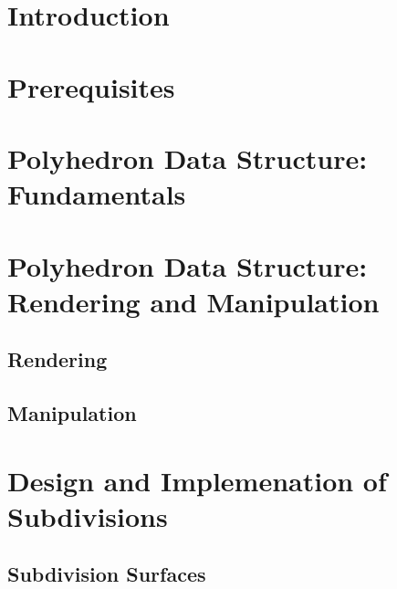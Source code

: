 \documentclass[letter,twoside,10pt]{article}
\begin{document}
\section{Introduction}
%

\section{Prerequisites}
% 

\section{Polyhedron Data Structure: Fundamentals}
 

\section{Polyhedron Data Structure: Rendering and Manipulation}

\subsection{Rendering}
%

\subsection{Manipulation} 
%


\section{Design and Implemenation of Subdivisions}

\subsection{Subdivision Surfaces}


\end{document}
